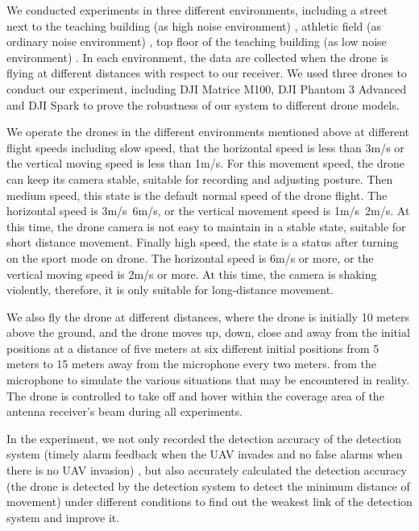 \documentclass{sig-alternate-10pt}
\begin{document}
We conducted experiments in three different environments, including a street next to the teaching building (as high noise environment) , athletic field (as ordinary noise environment) , top floor of the teaching building (as low noise environment) . In each environment, the data are collected when the drone is flying at different distances with respect to our receiver. We used three drones to conduct our experiment, including DJI Matrice M100, DJI Phantom 3 Advanced and DJI Spark to prove the robustness of our system to different drone models. 



\hspace{1mm} 
We operate the drones in the different environments mentioned above at different flight speeds including slow speed, that the horizontal speed is less than 3m/s or the vertical moving speed is less than 1m/s. For this movement speed, the drone can keep its camera stable, suitable for recording and adjusting posture. Then medium speed, this state is the default normal speed of the drone flight. The horizontal speed is 3m/s~6m/s, or the vertical movement speed is 1m/s~2m/s. At this time, the drone camera is not easy to maintain in a stable state, suitable for short distance movement. Finally high speed, the state is a status after turning on the sport mode on drone. The horizontal speed is 6m/s or more, or the vertical moving speed is 2m/s or more. At this time, the camera is shaking violently, therefore, it is only suitable for long-distance movement.

\hspace{1mm} 
We also fly the drone at different distances, where the drone is initially 10 meters above the ground, and the drone moves up, down, close and away from the initial positions at a distance of five meters at six different initial positions from 5 meters to 15 meters away from the microphone every two meters. from the microphone to simulate the various situations that may be encountered in reality. The drone is controlled to take off and hover within the coverage area of the antenna receiver’s beam during all experiments.

In the experiment, we not only recorded the detection accuracy of the detection system (timely alarm feedback when the UAV invades and no false alarms when there is no UAV invasion) , but also accurately calculated the detection accuracy (the drone is detected by the detection system to detect the minimum distance of movement) under different conditions to find out the weakest link of the detection system and improve it.
\end{document}
